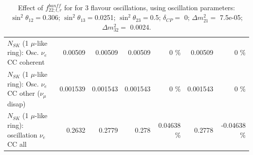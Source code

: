 \begin{table}
\begin{tabular}{| l | r | r | r  r | r  r |}
                          $N_{SK}$ (1 $\mu$-like ring): Osc. $\nu_e$ CC coherent &         0.00509 &         0.00509 &         0.00509 &        0 \%  &         0.00509 &        0 \%  \\ 
           $N_{SK}$ (1 $\mu$-like ring): Osc. $\nu_e$ CC other ($\nu_\mu$ disap) &        0.001539 &        0.001543 &        0.001543 &        0 \%  &        0.001543 &        0 \%  \\ 
                        $N_{SK}$ (1 $\mu$-like ring): oscillation $\nu_e$ CC all &          0.2632 &          0.2779 &           0.278 &  0.04638 \%  &          0.2778 & -0.04638 \%  \\ 
\hline
\hline
\end{tabular}
\caption{ Effect of $f_{22; t, r}^{banff}$ for for 3 flavour oscillations, using oscillation parameters:  $\sin^2\theta_{12} = $0.306; $\sin^2\theta_{13} = $0.0251; $\sin^2\theta_{23} = $0.5; $\delta_{CP} = $        0; $\Delta m^2_{21} = $    7.5e-05; $\Delta m^2_{32} = $    0.0024. }
\label{tab:num_banff_cc1piE1_1RmuT_3f_osc_t13:0.0251}
\end{table}
\clearpage
